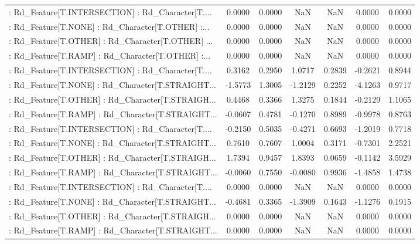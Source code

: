 \begin{longtable}{p{4cm}cccccc}
 : Rd\_Feature[T.INTERSECTION] : Rd\_Character[T.... &  0.0000 &    0.0000 &     NaN &          NaN &  0.0000 &  0.0000 \\
 : Rd\_Feature[T.NONE] : Rd\_Character[T.OTHER] :... &  0.0000 &    0.0000 &     NaN &          NaN &  0.0000 &  0.0000 \\
 : Rd\_Feature[T.OTHER] : Rd\_Character[T.OTHER] ... &  0.0000 &    0.0000 &     NaN &          NaN &  0.0000 &  0.0000 \\
 : Rd\_Feature[T.RAMP] : Rd\_Character[T.OTHER] :... &  0.0000 &    0.0000 &     NaN &          NaN &  0.0000 &  0.0000 \\
 : Rd\_Feature[T.INTERSECTION] : Rd\_Character[T.... &  0.3162 &    0.2950 &  1.0717 &       0.2839 & -0.2621 &  0.8944 \\
 : Rd\_Feature[T.NONE] : Rd\_Character[T.STRAIGHT... & -1.5773 &    1.3005 & -1.2129 &       0.2252 & -4.1263 &  0.9717 \\
 : Rd\_Feature[T.OTHER] : Rd\_Character[T.STRAIGH... &  0.4468 &    0.3366 &  1.3275 &       0.1844 & -0.2129 &  1.1065 \\
 : Rd\_Feature[T.RAMP] : Rd\_Character[T.STRAIGHT... & -0.0607 &    0.4781 & -0.1270 &       0.8989 & -0.9978 &  0.8763 \\
 : Rd\_Feature[T.INTERSECTION] : Rd\_Character[T.... & -0.2150 &    0.5035 & -0.4271 &       0.6693 & -1.2019 &  0.7718 \\
 : Rd\_Feature[T.NONE] : Rd\_Character[T.STRAIGHT... &  0.7610 &    0.7607 &  1.0004 &       0.3171 & -0.7301 &  2.2521 \\
 : Rd\_Feature[T.OTHER] : Rd\_Character[T.STRAIGH... &  1.7394 &    0.9457 &  1.8393 &       0.0659 & -0.1142 &  3.5929 \\
 : Rd\_Feature[T.RAMP] : Rd\_Character[T.STRAIGHT... & -0.0060 &    0.7550 & -0.0080 &       0.9936 & -1.4858 &  1.4738 \\
 : Rd\_Feature[T.INTERSECTION] : Rd\_Character[T.... &  0.0000 &    0.0000 &     NaN &          NaN &  0.0000 &  0.0000 \\
 : Rd\_Feature[T.NONE] : Rd\_Character[T.STRAIGHT... & -0.4681 &    0.3365 & -1.3909 &       0.1643 & -1.1276 &  0.1915 \\
 : Rd\_Feature[T.OTHER] : Rd\_Character[T.STRAIGH... &  0.0000 &    0.0000 &     NaN &          NaN &  0.0000 &  0.0000 \\
 : Rd\_Feature[T.RAMP] : Rd\_Character[T.STRAIGHT... &  0.0000 &    0.0000 &     NaN &          NaN &  0.0000 &  0.0000 \\

\end{longtable}
